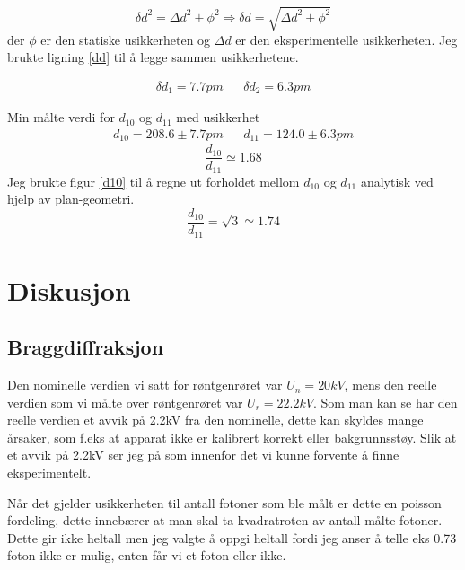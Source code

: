 \documentclass[norsk,a4paper,12pt]{article}
\begin{document}
\begin{equation}
\delta d^2 = \Delta d^2 + \phi^2 \Rightarrow \delta d = \sqrt{\Delta d^2 + \phi^2}
\label{dd}
\end{equation}
der $\phi$ er den statiske usikkerheten og $\Delta d$ er den eksperimentelle usikkerheten.
Jeg brukte ligning \vref{dd} til å legge sammen usikkerhetene.

\begin{align*}
\delta d_1 = 7.7 pm  && \delta d_2 = 6.3 pm
\end{align*}

Min målte verdi for $d_{10}$ og $d_{11}$ med usikkerhet
\begin{align*}
d_{10} = 208.6 \pm 7.7 pm  && d_{11} = 124.0 \pm 6.3 pm
\end{align*}
$$
\frac{d_{10}}{d_{11}}  \simeq 1.68
$$
Jeg brukte figur \vref{d10} til å regne ut forholdet mellom $d_{10}$ og $d_{11}$ analytisk ved hjelp av plan-geometri. 
$$
\frac{d_{10}}{d_{11}} = \sqrt{3} \simeq 1.74
$$


\section{Diskusjon}
\subsection{Braggdiffraksjon}
Den nominelle verdien vi satt for røntgenrøret var $U_n = 20kV$, mens den reelle verdien som vi målte over røntgenrøret var $U_r = 22.2kV$.
Som man kan se har den reelle verdien et avvik på 2.2kV fra den nominelle, dette kan skyldes mange årsaker, som f.eks at apparat ikke er kalibrert korrekt eller bakgrunnsstøy. Slik at et avvik på 2.2kV ser jeg på som innenfor det vi kunne forvente å finne eksperimentelt. 

Når det gjelder usikkerheten til antall fotoner som ble målt er dette en poisson fordeling, dette innebærer at man skal ta kvadratroten av antall målte fotoner. Dette gir ikke heltall men jeg valgte å oppgi heltall fordi jeg anser å telle eks 0.73 foton ikke er mulig, enten får vi et foton eller ikke.
\end{document}
